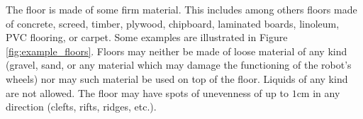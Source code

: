 The floor is made of some firm material. This includes among others floors made of concrete, screed, timber, plywood, chipboard, laminated boards, linoleum, PVC flooring, or carpet. Some examples are illustrated in Figure \ref{fig:example_floors}. Floors may neither be made of loose material of any kind (gravel, sand, or any material which may damage the functioning of the robot's wheels) nor may such material be used on top of the floor. Liquids of any kind are not allowed. The floor may have spots of unevenness of up to $1\si{\centi\meter}$ in any direction (clefts, rifts, ridges, etc.).


\begin{figure} [h!]
	\begin{center}
		 \hspace{0.1cm}
		 \hspace{0.1cm}
		 \hspace{0.1cm}
		 \hspace{0.1cm}
		\\

\end{center}
\end{figure}
